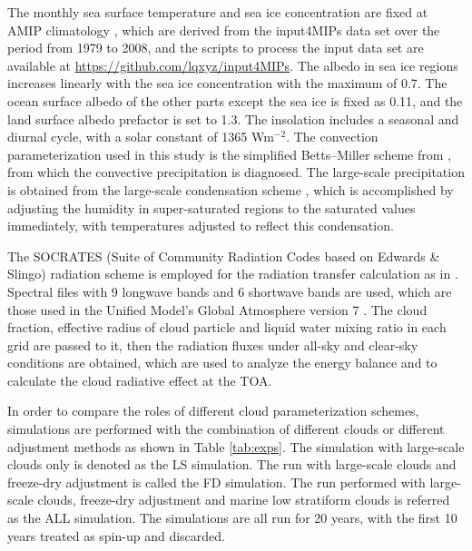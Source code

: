 The monthly sea surface temperature and sea ice concentration are fixed at AMIP climatology \citep{Taylor2000sea}, which are derived from the input4MIPs data set \citep{Durack2018} over the period from 1979 to 2008, and the scripts to process the input data set are available at \url{https://github.com/lqxyz/input4MIPs}. The albedo in sea ice regions increases linearly with the sea ice concentration with the maximum of 0.7. The ocean surface albedo of the other parts except the sea ice is fixed as 0.11, and the land surface albedo prefactor is set to 1.3. The insolation includes a seasonal and diurnal cycle, with a solar constant  of 1365 Wm$^{-2}$. The convection parameterization used in this study is the simplified Betts--Miller scheme from \citet{Frierson2007}, from which the convective precipitation is diagnosed. The large-scale precipitation is obtained from the large-scale condensation scheme \citep{Frierson2007}, which is accomplished by adjusting the humidity in super-saturated regions to the saturated values immediately, with temperatures adjusted to reflect this condensation. 

The SOCRATES (Suite of Community Radiation Codes based on Edwards \& Slingo) radiation scheme  \citep{Edwards1996, Manners2015} is employed for the radiation transfer calculation as in \citet{Thomson2019}. Spectral files with 9 longwave bands and 6 shortwave bands are used, which are those used in the Unified Model's Global Atmosphere version 7 \citep{Walters2019}. The cloud fraction, effective radius of cloud particle and liquid water mixing ratio in each grid are passed to it, then the radiation fluxes under all-sky and clear-sky conditions are obtained, which are used to analyze the energy balance and to calculate the cloud radiative effect \citep{Ramanathan1989, Li2017} at the TOA.

In order to compare the roles of different cloud parameterization schemes, simulations are performed with the combination of different clouds or different adjustment methods as shown in Table \ref{tab:exps}. The simulation with large-scale clouds only is denoted as the LS simulation. The run with large-scale clouds and freeze-dry adjustment is called the FD simulation. The run performed with large-scale clouds, freeze-dry adjustment and marine low stratiform clouds is referred as the ALL simulation. The simulations are all run for 20 years, with the first 10 years treated as spin-up and discarded.

